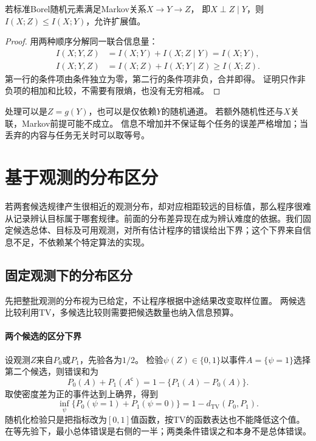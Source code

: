 \begin{theorem}[数据处理不等式]
\label{thm:information-data-processing}
若标准Borel随机元素满足Markov关系\(X\to Y\to Z\)，
即\(X\perp Z\mid Y\)，则\(I(X;Z)\leq I(X;Y)\)，允许扩展值。
\end{theorem}
\begin{proof}
用两种顺序分解同一联合信息量：
\[
\begin{aligned}
  I(X;Y,Z)&=I(X;Y)+I(X;Z\mid Y)=I(X;Y),\\
  I(X;Y,Z)&=I(X;Z)+I(X;Y\mid Z)\geq I(X;Z).
\end{aligned}
\]
第一行的条件项由条件独立为零，第二行的条件项非负，合并即得。
证明只作非负项的相加和比较，不需要有限熵，也没有无穷相减。
\end{proof}

处理可以是\(Z=g(Y)\)，也可以是仅依赖\(Y\)的随机通道。
若额外随机性还与\(X\)关联，Markov前提可能不成立。
信息不增加并不保证每个任务的误差严格增加；当丢弃的内容与任务无关时可以取等号。

\section{基于观测的分布区分}
\label{sec:information-lower-bounds}

若两套候选规律产生很相近的观测分布，却对应相距较远的目标值，那么程序很难从记录辨认目标属于哪套规律。前面的分布差异现在成为辨认难度的依据。我们固定候选总体、目标及可用观测，对所有估计程序的错误给出下界；这个下界来自信息不足，不依赖某个特定算法的实现。

\subsection{固定观测下的分布区分}
\label{sec:information-fixed-observations}

先把整批观测的分布视为已给定，不让程序根据中途结果改变取样位置。
两候选比较利用TV，多候选比较则需要把候选数量也纳入信息预算。

\paragraph{两个候选的区分下界}
\label{sec:information-two-candidates}

设观测\(Z\)来自\(P_0\)或\(P_1\)，先验各为\(1/2\)。
检验\(\psi(Z)\in\{0,1\}\)以事件\(A=\{\psi=1\}\)选择第二个候选，则错误和为
\[
  P_0(A)+P_1(A^{\mathsf c})=1-\{P_1(A)-P_0(A)\}.
\]
取使密度差为正的事件达到上确界，得到
\begin{equation}
  \inf_\psi\{P_0(\psi=1)+P_1(\psi=0)\}
     =1-d_{\mathrm{TV}}(P_0,P_1).
  \label{eq:information-binary-testing-tv}
\end{equation}
随机化检验只是把指标改为\([0,1]\)值函数，按TV的函数表达也不能降低这个值。
在等先验下，最小总体错误是右侧的一半；两类条件错误之和本身不是总体错误。

